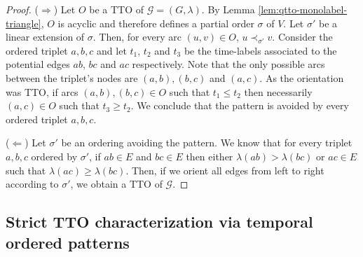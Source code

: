\documentclass[runningheads]{llncs}
\begin{document}
\begin{proof}
\vspace{2ex}

($\Rightarrow$) Let $O$ be a TTO of $\mathcal{G}=(G, \lambda)$. By Lemma \ref{lem:qtto-monolabel-triangle}, $O$ is acyclic and therefore defines a partial order $\sigma$ of $V$. Let $\sigma'$ be a linear extension of $\sigma$. Then, for every arc $(u,v) \in O$, $u \prec_{\sigma'} v$. Consider the ordered triplet $a,b,c$ and let $t_{1}$, $t_{2}$ and $t_{3}$ be the time-labels associated to the potential edges $ab$, $bc$ and $ac$ respectively. Note that the only possible arcs between the triplet's nodes are $(a,b), (b,c)$ and $(a,c)$. As the orientation was TTO, if arcs $(a,b), (b,c) \in O$ such that $t_1 \leq t_2$ then necessarily $(a,c) \in O$ such that $t_3 \geq t_2$. We conclude that the pattern is avoided by every ordered triplet $a,b,c$.

\vspace{2ex}
($\Leftarrow$) Let $\sigma'$ be an ordering avoiding the pattern. We know that for every triplet $a,b,c$ ordered by $\sigma'$, if $ab \in E$ and $bc \in E$ then either $\lambda(ab) > \lambda(bc)$ or $ac \in E$ such that $\lambda(ac) \geq \lambda(bc)$. Then, if we orient all edges from left to right according to $\sigma'$, we obtain a TTO of $\mathcal{G}$.

\end{proof}


\subsection{Strict TTO characterization via temporal ordered patterns}
\label{appendix:strict-tto-pattern-characterization}
\end{document}
